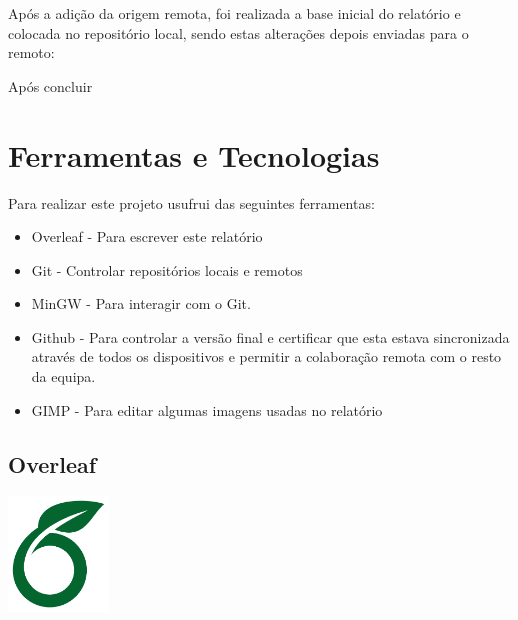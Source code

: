 \documentclass[a4paper,12pt]{article}
\begin{document}
\noindent{}

\vspace{0.3cm}

Após a adição da origem remota, foi realizada a base inicial do relatório e colocada no repositório local, sendo estas alterações depois enviadas para o remoto:

\vspace{0.3cm}

\noindent{}

Após concluir

\section{Ferramentas e Tecnologias}
Para realizar este projeto usufrui das seguintes ferramentas:
\begin{itemize}
    \item Overleaf - Para escrever este relatório
    \item Git - Controlar repositórios locais e remotos
    \item MinGW - Para interagir com o Git.
    \item Github - Para  controlar a versão final e certificar que esta estava sincronizada através de todos os dispositivos e permitir a colaboração remota com o resto da equipa.
    \item GIMP - Para editar algumas imagens usadas no relatório
\end{itemize}

\subsection{Overleaf}
    \includegraphics[width=0.2\textwidth]{overleaf.jpg} %
    \vspace{0.5cm}
\end{document}
